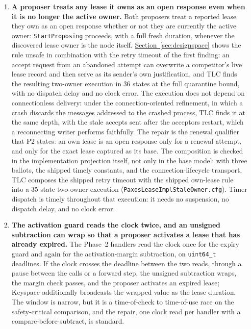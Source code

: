 \documentclass[final,5p,times,twocolumn,number]{elsarticle}
\newcommand{\code}[1]{\texttt{#1}}
\newcommand{\secref}[1]{\hyperref[#1]{Section~\ref*{#1}}}
\begin{document}
\begin{enumerate}
\item \textbf{A proposer treats any lease it owns as an open response even when it is no longer the active owner.}  Both proposers treat a reported lease they own as an open response whether or not they are currently the active owner: \code{StartProposing} proceeds, with a full fresh duration, whenever the discovered lease owner is the node itself.  \secref{sec:designspace} shows the rule unsafe in combination with the retry timeout of the first finding: an accept request from an abandoned attempt can overwrite a competitor's live lease record and then serve as its sender's own justification, and TLC finds the resulting two-owner execution in 36 states at the full quarantine bound, with no dispatch delay and no clock error.  The execution does not depend on connectionless delivery: under the connection-oriented refinement, in which a crash discards the messages addressed to the crashed process, TLC finds it at the same depth, with the stale accepts sent after the acceptors restart, which a reconnecting writer performs faithfully.  The repair is the renewal qualifier that P2 states: an own lease is an open response only for a renewal attempt, and only for the exact lease captured as its base.  The composition is checked in the implementation projection itself, not only in the base model: with three ballots, the shipped timely constants, and the connection-lifecycle transport, TLC composes the shipped retry timeout with the shipped own-lease rule into a 35-state two-owner execution (\code{PaxosLeaseImplStaleOwner.cfg}).  Timer dispatch is timely throughout that execution: it needs no suspension, no dispatch delay, and no clock error.
\item \textbf{The activation guard reads the clock twice, and an unsigned subtraction can wrap so that a proposer activates a lease that has already expired.}  The Phase~2 handlers read the clock once for the expiry guard and again for the activation-margin subtraction, on \code{uint64\_t} deadlines.  If the clock crosses the deadline between the two reads, through a pause between the calls or a forward step, the unsigned subtraction wraps, the margin check passes, and the proposer activates an expired lease; Keyspace additionally broadcasts the wrapped value as the lease duration.  The window is narrow, but it is a time-of-check to time-of-use race on the safety-critical comparison, and the repair, one clock read per handler with a compare-before-subtract, is standard.
\end{enumerate}
\end{document}
